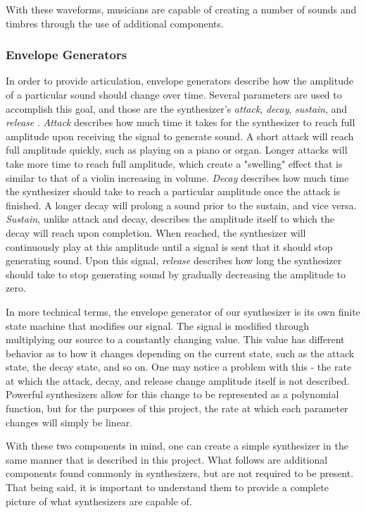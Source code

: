 \documentclass[12pt]{article}
\begin{document}
With these waveforms, musicians are capable of creating a number of sounds and timbres through the use of additional components.

\subsubsection{Envelope Generators}
In order to provide articulation, envelope generators describe how the amplitude of a particular sound should change over time. Several parameters are used to accomplish this goal, and those are the synthesizer's \textit{attack}, \textit{decay}, \textit{sustain}, and \textit{release} \cite{Pirkle_2021}. \textit{Attack} describes how much time it takes for the synthesizer to reach full amplitude upon receiving the signal to generate sound. A short attack will reach full amplitude quickly, such as playing on a piano or organ. Longer attacks will take more time to reach full amplitude, which create a "swelling" effect that is similar to that of a violin increasing in volume. \textit{Decay} describes how much time the synthesizer should take to reach a particular amplitude once the attack is finished. A longer decay will prolong a sound prior to the sustain, and vice versa. \textit{Sustain}, unlike attack and decay, describes the amplitude itself to which the decay will reach upon completion. When reached, the synthesizer will continuously play at this amplitude until a signal is sent that it should stop generating sound. Upon this signal, \textit{release} describes how long the synthesizer should take to stop generating sound by gradually decreasing the amplitude to zero. 

In more technical terms, the envelope generator of our synthesizer is its own finite state machine that modifies our signal. The signal is modified through multiplying our source to a constantly changing value. This value has different behavior as to how it changes depending on the current state, such as the attack state, the decay state, and so on. One may notice a problem with this - the rate at which the attack, decay, and release change amplitude itself is not described. Powerful synthesizers allow for this change to be represented as a polynomial function, but for the purposes of this project, the rate at which each parameter changes will simply be linear. 

With these two components in mind, one can create a simple synthesizer in the same manner that is described in this project. What follows are additional components found commonly in synthesizers, but are not required to be present. That being said, it is important to understand them to provide a complete picture of what synthesizers are capable of. 
\end{document}
